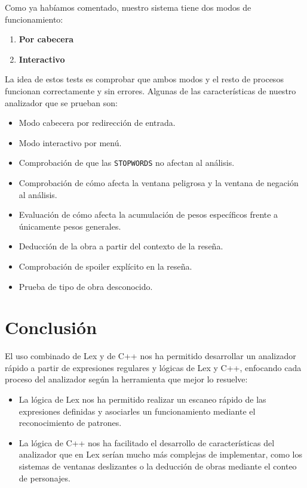 \documentclass{article}
\begin{document}
Como ya habíamos comentado, nuestro sistema tiene dos modos de funcionamiento:
\begin{enumerate}
    \item \textbf{Por cabecera}
    \item \textbf{Interactivo}
\end{enumerate}

La idea de estos tests es comprobar que ambos modos y el resto de procesos funcionan correctamente y sin errores. Algunas de las características de nuestro analizador que se prueban son:
\begin{itemize}
    \item Modo cabecera por redirección de entrada.
    \item Modo interactivo por menú.
    \item Comprobación de que las \texttt{STOPWORDS} no afectan al análisis.
    \item Comprobación de cómo afecta la ventana peligrosa y la ventana de negación al análisis.
    \item Evaluación de cómo afecta la acumulación de pesos específicos frente a únicamente pesos generales.
    \item Deducción de la obra a partir del contexto de la reseña.
    \item Comprobación de spoiler explícito en la reseña.
    \item Prueba de tipo de obra desconocido.
\end{itemize}


\newpage

\section{Conclusión}

El uso combinado de Lex y de C++ nos ha permitido desarrollar un analizador rápido a partir de expresiones regulares y lógicas de Lex y C++, enfocando cada proceso del analizador según la herramienta que mejor lo resuelve:

\begin{itemize}
    \item La lógica de Lex nos ha permitido realizar un escaneo rápido de las expresiones definidas y asociarles un funcionamiento mediante el reconocimiento de patrones.
    \item La lógica de C++ nos ha facilitado el desarrollo de características del analizador que en Lex serían mucho más complejas de implementar, como los sistemas de ventanas deslizantes o la deducción de obras mediante el conteo de personajes.
\end{itemize}
\end{document}
